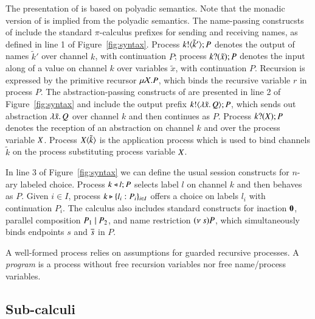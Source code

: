 The presentation of \HOp is based on polyadic semantics.
Note that the monadic version of \HOp is implied from
the polyadic semantics.
The name-passing construcsts of \HOp include the
standard $\pi$-calculus prefixes for sending and receiving names,
as defined in line 1 of Figure~\ref{fig:syntax}.
Process $k ! \langle \tilde{k}' \rangle ; P$ denotes the output of names $\tilde{k}'$
over channel $k$,
with continuation $P$;
process $k ? (\tilde{x}) ; P$ denotes the input along  of a value
on channel $k$ over variables $\tilde{x}$, with continuation $P$. 
Recursion is expressed by the primitive recursor $\mu \mathcal{X}. P$,
which binds the recursive variable $r$ in process $P$.
The abstraction-passing constructs of \HOp are presented in line
2 of Figure~\ref{fig:syntax} and include 
the output prefix $k ! \langle \lambda \tilde{x}.\,Q \rangle ; P$, which 
sends out abstraction $\lambda \tilde{x}.\,Q$ over channel $k$ and then continues as $P$. 
Process $k ? (X) ; P$ denotes the reception of an abstraction
on channel $k$ and over the process variable $X$.
Process $X\langle \tilde{k} \rangle$ is the application
process which is used to bind channels $\tilde{k}$ on the process
substituting process variable $X$.

In line 3 of Figure~\ref{fig:syntax} we can define the usual session
constructs for $n$-ary labeled choice.
Process $k \triangleleft l ; P$ selects label $l$ on channel $k$ and then behaves as $P$. 
Given $i \in I$, 
process $k \triangleright \{l_i:P_i\}_{i \in I}$ offers a choice on labels $l_i$ with
continuation $P_i$.
The calculus also includes standard constructs for 
inaction $\mathbf{0}$, 
parallel composition $P_1 \;|\; P_2$, and 
name restriction $(\nu\ s) P$, which simultaneously binds endpoints $s$ and $\overline{s}$ in $P$.


A well-formed process relies on assumptions for guarded recursive processes.
A \emph{program} is a process without free 
recursion variables nor free name/process variables.



\subsection{Sub-calculi}

